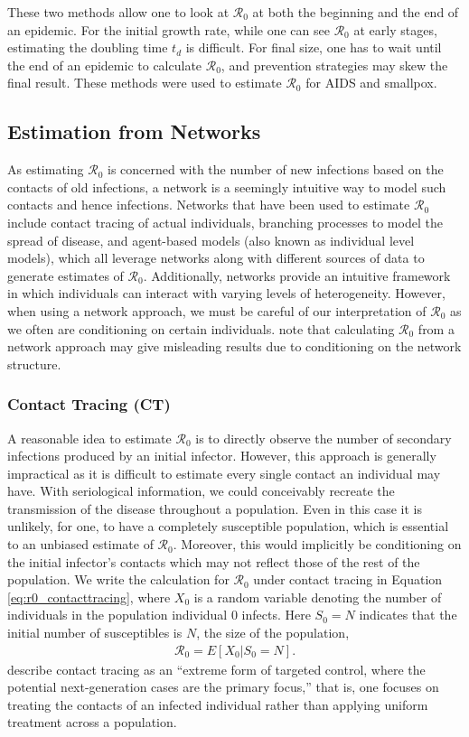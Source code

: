 \documentclass[12pt]{article}
\newcommand{\rr}{\ensuremath{\mathcal{R}_0}}
\begin{document}
  These two methods allow one to look at $\rr$ at both the beginning and the end of an epidemic.   For the initial growth rate, while one can see $\rr$ at early stages, estimating the doubling time $t_d$ is difficult.  For final size, one has to wait until the end of an epidemic to calculate $\rr$, and prevention strategies may skew the final result.  These methods were used to estimate $\rr$ for AIDS and smallpox.

  \subsection{Estimation from Networks}
As estimating $\rr$ is concerned with the number of new infections based on the contacts of old infections, a network is a seemingly intuitive way to model such contacts and hence infections.  Networks that have been used to estimate $\rr$ include contact tracing of actual individuals, branching processes to model the spread of disease, and agent-based models (also known as individual level models), which all leverage networks along with different sources of data to generate estimates of $\rr$.  Additionally, networks provide an intuitive framework in which individuals can interact with varying levels of heterogeneity.  However, when using a network approach, we must be careful of our interpretation of $\rr$ as we often are conditioning on certain individuals.    \cite{breban2007} note that calculating $\rr$ from a network approach may give misleading results due to conditioning on the network structure.
  
\label{sec:network}

\subsubsection{Contact Tracing (CT)}
\label{sec:contact_tracing}
A reasonable idea to estimate $\rr$ is to directly observe the number of secondary infections produced by an initial infector.  However, this approach is generally impractical as it is difficult to estimate every single contact an individual may have.   With seriological information, we could conceivably recreate the transmission of the disease throughout a population.  Even in this case it is unlikely, for one, to have a completely susceptible population, which is essential to an unbiased estimate of $\rr$.  Moreover, this would implicitly be conditioning on the initial infector's contacts which may not reflect those of the rest of the population.  We write the calculation for $\rr$ under contact tracing in Equation \ref{eq:r0_contacttracing}, where $X_0$ is a random variable denoting the number of individuals in the population individual 0 infects.  Here $S_0=N$ indicates that the initial number of susceptibles is $N$, the size of the population,
\begin{align}\label{eq:r0_contacttracing}
\rr = E[ X_0 | S_0 = N].
\end{align}
\cite{eames2003} describe contact tracing as an ``extreme form of targeted control, where the potential next-generation cases are the primary focus,'' that is, one focuses on treating the contacts of an infected individual rather than applying uniform treatment across a population.
\end{document}
